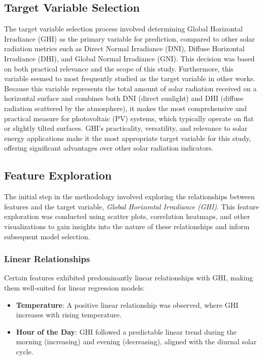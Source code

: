 \documentclass[10pt,twocolumn]{article}
\begin{document}
\subsection{Target Variable Selection}
The target variable selection process involved determining Global Horizontal Irradiance (GHI) as the primary variable for prediction, compared to other solar radiation metrics such as Direct Normal Irradiance (DNI), Diffuse Horizontal Irradiance (DHI), and Global Normal Irradiance (GNI). This decision was based on both practical relevance and the scope of this study. Furthermore, this variable seemed to most frequently studied as the target variable in other works. Because this variable represents the total amount of solar radiation received on a horizontal surface and combines both DNI (direct sunlight) and DHI (diffuse radiation scattered by the atmosphere), it makes the most comprehensive and practical measure for photovoltaic (PV) systems, which typically operate on flat or slightly tilted surfaces.  GHI’s practicality, versatility, and relevance to solar energy applications make it the most appropriate target variable for this study, offering significant advantages over other solar radiation indicators.
\subsection{Feature Exploration}

The initial step in the methodology involved exploring the relationships between features and the target variable, \textit{Global Horizontal Irradiance (GHI)}. This feature exploration was conducted using scatter plots, correlation heatmaps, and other visualizations to gain insights into the nature of these relationships and inform subsequent model selection.

\subsubsection{Linear Relationships}
Certain features exhibited predominantly linear relationships with GHI, making them well-suited for linear regression models:
\begin{itemize}
    \item \textbf{Temperature}: A positive linear relationship was observed, where GHI increases with rising temperature.
    \item \textbf{Hour of the Day}: GHI followed a predictable linear trend during the morning (increasing) and evening (decreasing), aligned with the diurnal solar cycle.
\end{itemize}
\end{document}
